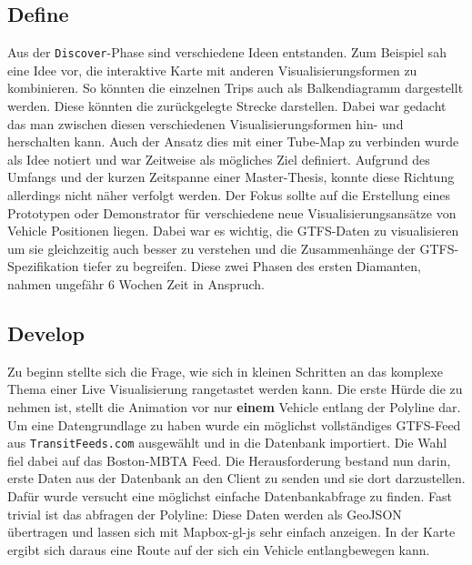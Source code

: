 \begin{newpage}
    \subsection{Define}
    \label{sub:define}
      Aus der \texttt{Discover}-Phase sind verschiedene Ideen entstanden. Zum Beispiel sah eine Idee vor, die interaktive Karte mit anderen Visualisierungsformen zu kombinieren. So könnten die einzelnen Trips auch als Balkendiagramm dargestellt werden. Diese könnten die zurückgelegte Strecke darstellen. Dabei war gedacht das man zwischen diesen verschiedenen Visualisierungsformen hin- und herschalten kann. Auch der Ansatz dies mit einer Tube-Map zu verbinden wurde als Idee notiert und war Zeitweise als mögliches Ziel definiert. Aufgrund des Umfangs und der kurzen Zeitspanne einer Master-Thesis, konnte diese Richtung allerdings nicht näher verfolgt werden. Der Fokus sollte auf die Erstellung eines Prototypen oder Demonstrator für verschiedene neue Visualisierungsansätze von Vehicle Positionen liegen. Dabei war es wichtig, die GTFS-Daten zu visualisieren um sie gleichzeitig auch besser zu verstehen und die Zusammenhänge der GTFS-Spezifikation tiefer zu begreifen. Diese zwei Phasen des ersten Diamanten, nahmen ungefähr 6 Wochen Zeit in Anspruch.

      

    \subsection{Develop}
    \label{sub:develop}
      Zu beginn stellte sich die Frage, wie sich in kleinen Schritten an das komplexe Thema einer Live Visualisierung rangetastet werden kann. Die erste Hürde die zu nehmen ist, stellt die Animation vor nur \textbf{einem} Vehicle entlang der Polyline dar.
      Um eine Datengrundlage zu haben wurde ein möglichst vollständiges GTFS-Feed aus \texttt{TransitFeeds.com} ausgewählt und in die Datenbank importiert. Die Wahl fiel dabei auf das Boston-MBTA Feed. Die Herausforderung bestand nun darin, erste Daten aus der Datenbank an den Client zu senden und sie dort darzustellen. Dafür wurde versucht eine möglichst einfache Datenbankabfrage zu finden. Fast trivial ist das abfragen der Polyline: \colorbox{lightGrey}{\texttt{}}
      Diese Daten werden als GeoJSON übertragen und lassen sich mit Mapbox-gl-js sehr einfach anzeigen. In der Karte ergibt sich daraus eine Route auf der sich ein Vehicle entlangbewegen kann.


\end{newpage}
